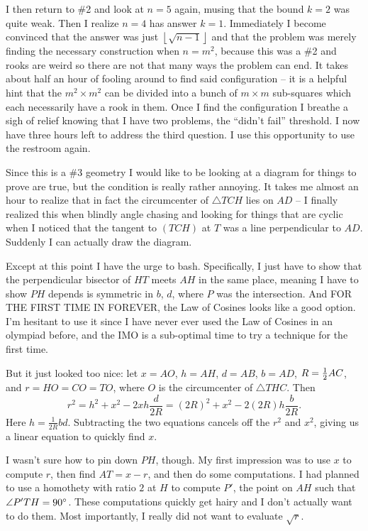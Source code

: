 \documentclass[11pt]{scrreprt}
\numberwithin{figure}{chapter}
\begin{document}
I then return to \#2 and look at $n=5$ again, musing that the bound $k=2$ was quite weak.
Then I realize $n=4$ has answer $k=1$.
Immediately I become convinced that the answer was just
$\left\lfloor \sqrt{n-1} \right\rfloor$ and that the problem was merely
finding the necessary construction when $n=m^2$,
because this was a \#2 and rooks are weird so there are not that many ways
the problem can end.
It takes about half an hour of fooling around to find said configuration -- it
is a helpful hint that the $m^2 \times m^2$ can be
divided into a bunch of $m \times m$ sub-squares which each necessarily have a rook in them.
Once I find the configuration I breathe a sigh of relief knowing that I have two problems,
the ``didn't fail'' threshold.
I now have three hours left to address the third question.
I use this opportunity to use the restroom again.

Since this is a \#3 geometry I would like to be looking at a diagram for things to prove are true,
but the condition is really rather annoying.
It takes me almost an hour to realize that in fact the circumcenter of
$\triangle TCH$ lies on $AD$ -- I finally realized this when blindly
angle chasing and looking for things that are cyclic when I noticed that the
tangent to $(TCH)$ at $T$ was a line perpendicular to $AD$.
Suddenly I can actually draw the diagram.

Except at this point I have the urge to bash.
Specifically, I just have to show that the perpendicular bisector of $HT$ meets $AH$ in the same place,
meaning I have to show $PH$ depends is symmetric in $b$, $d$, where $P$ was the intersection.
And FOR THE FIRST TIME IN FOREVER, the Law of Cosines looks like a good option.
I'm hesitant to use it since I have never ever used the Law of Cosines in an olympiad before,
and the IMO is a sub-optimal time to try a technique for the first time.

But it just looked too nice: let $x=AO$, $h = AH$, $d=AB$, $b=AD$, $R = \frac{1}{2} AC$, and $r=HO=CO=TO$,
where $O$ is the circumcenter of $\triangle THC$.  Then
\[ r^2 = h^2 + x^2 - 2xh \frac{d}{2R}
  = (2R)^2 + x^2 - 2(2R)h \frac{b}{2R}. \]
Here $h = \frac{1}{2R} bd$. Subtracting the two equations cancels off the $r^2$ and $x^2$,
giving us a linear equation to quickly find $x$.

I wasn't sure how to pin down $PH$, though.
My first impression was to use $x$ to compute $r$, then find $AT = x-r$, and then do some computations.
I had planned to use a homothety with ratio $2$ at $H$ to compute $P'$,
the point on $AH$ such that $\angle P'TH = 90^\circ$.
These computations quickly get hairy and I don't actually want to do them.
Most importantly, I really did not want to evaluate $\sqrt r$.
\end{document}
